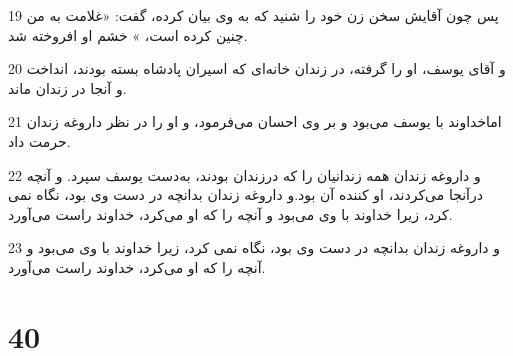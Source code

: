 \par 19 پس چون آقایش سخن زن خود را شنید که به وی بیان کرده، گفت: «غلامت به من چنین کرده است، » خشم او افروخته شد.
\par 20 و آقای یوسف، او را گرفته، در زندان خانه‌ای که اسیران پادشاه بسته بودند، انداخت و آنجا در زندان ماند.
\par 21 اماخداوند با یوسف می‌بود و بر وی احسان می‌فرمود، و او را در نظر داروغه زندان حرمت داد.
\par 22 و داروغه زندان همه زندانیان را که درزندان بودند، به‌دست یوسف سپرد. و آنچه درآنجا می‌کردند، او کننده آن بود.و داروغه زندان بدانچه در دست وی بود، نگاه نمی کرد، زیرا خداوند با وی می‌بود و آنچه را که او می‌کرد، خداوند راست می‌آورد.
\par 23 و داروغه زندان بدانچه در دست وی بود، نگاه نمی کرد، زیرا خداوند با وی می‌بود و آنچه را که او می‌کرد، خداوند راست می‌آورد.
 
\chapter{40}

